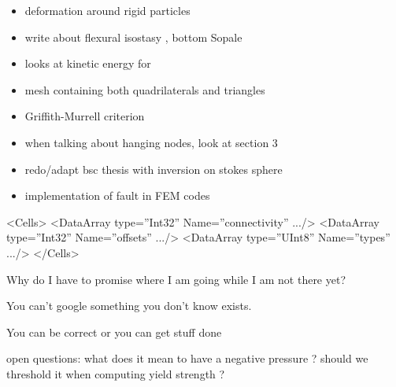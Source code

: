 \begin{itemize}
\item deformation around rigid particles \cite{ilma93}
\item write about flexural isostasy \cite{maie12}, bottom Sopale
\item \cite{maie12} looks at kinetic energy for \cite{trab90} 
\item mesh containing both quadrilaterals and triangles \cite{anbr80}
\item Griffith-Murrell criterion \cite{brau94}
\item when talking about hanging nodes, look at \cite{bugs09} section 3
\item redo/adapt bsc thesis with inversion on stokes sphere
\item implementation of fault in FEM codes \cite{zhgu94,zhgu95}
\end{itemize}

 <Cells>
      <DataArray type=”Int32” Name=”connectivity” .../>
      <DataArray type=”Int32” Name=”offsets” .../>
      <DataArray type=”UInt8” Name=”types” .../>
    </Cells>


Why do I have to promise where I am going while I am not there yet?

You can't google something you don't know exists.

You can be correct or you can get stuff done

open questions:
what does it mean to have a negative pressure ? should we threshold it when computing yield strength ? 
